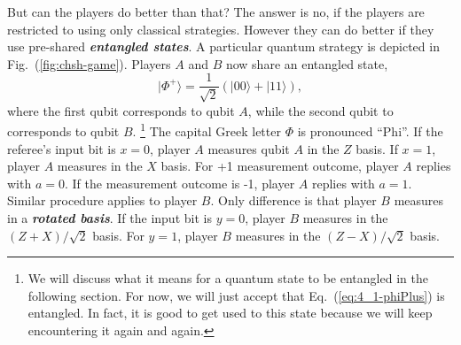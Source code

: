 But can the players do better than that?
The answer is no, if the players are restricted to using only classical strategies.
However they can do better if they use pre-shared \textbf{\emph{entangled states}}.
A particular quantum strategy is depicted in Fig.~(\ref{fig:chsh-game}).
Players $A$ and $B$ now share an entangled state,
\begin{equation}
    |\Phi^+\rangle = \frac{1}{\sqrt{2}} (|00\rangle + |11\rangle),
    \label{eq:4_1-phiPlus}
\end{equation}
where the first qubit corresponds to qubit $A$, while the second qubit to corresponds to qubit $B$.
\footnote{We will discuss what it means for a quantum state to be entangled in the following section.
For now, we will just accept that Eq.~(\ref{eq:4_1-phiPlus}) is entangled.
In fact, it is good to get used to this state because we will keep encountering it again and again.}
The capital Greek letter $\Phi$ is pronounced ``Phi''.
If the referee's input bit is $x=0$, player $A$ measures qubit $A$ in the $Z$ basis.
If $x=1$, player $A$ measures in the $X$ basis.
For +1 measurement outcome, player $A$ replies with $a=0$.
If the measurement outcome is -1, player $A$ replies with $a=1$.
Similar procedure applies to player $B$.
Only difference is that player $B$ measures in a \textbf{\emph{rotated basis}}.
If the input bit is $y=0$, player $B$ measures in the $(Z+X)/\sqrt{2}$ basis.
For $y=1$, player $B$ measures in the $(Z-X)/\sqrt{2}$ basis.


